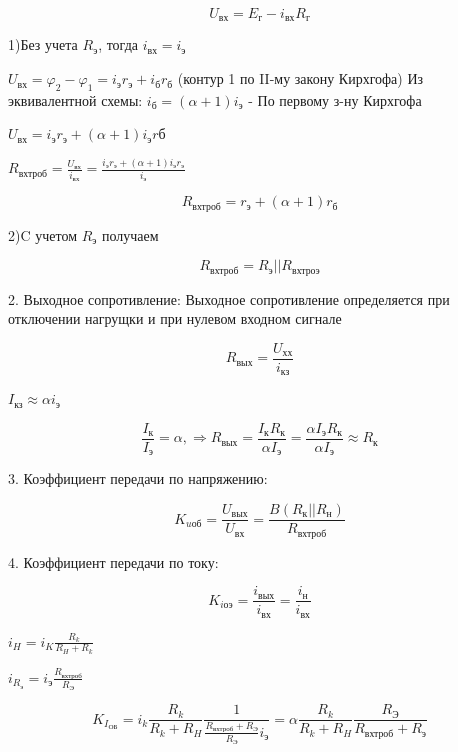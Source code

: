 \documentclass[12pt,a4paper]{article}
\begin{document}
$$U_\textit{вх}=E_\textit{г}-i_\textit{вх}R_\textit{г}$$

1)Без учета $R_\textit{э}$, тогда $i_\textit{вх}=i_\textit{э}$

$U_\textit{вх}=\varphi_2-\varphi_1=i_\textit{э}r_\textit{э}+i_\textit{б}r_\textit{б}$
(контур 1 по II-му закону Кирхгофа)
Из эквивалентной схемы:
$i_\textit{б}=(\alpha+1)i_\textit{э}$ - По первому з-ну Кирхгофа

$U_\textit{вх}=i_\textit{э}r_\textit{э}+(\alpha+1)i_\textit{э}r\textit{б}$

$R_\textit{вхтроб}=\frac{U_\textit{вх}}{i_\textit{вх}}=\frac{i_\textit{э}r_\textit{э}+(\alpha+1)i_\textit{э}r_\textit{э}}{i_\textit{э}}$

$$
R_\textit{вхтроб}=r_\textit{э} + (\alpha+1)r_\textit{б}
$$

2)C учетом $R_\textit{э}$ получаем

$$
R_\textit{вхтроб}=R_\textit{э}||R_\textit{вхтроэ}
$$

2. Выходное сопротивление:
 Выходное сопротивление определяется при отключении нагрущки и при нулевом входном сигнале
 
 $$R_\textit{вых}=\frac{U_\textit{хх}}{i_\textit{кз}}$$

$ I_\textit{кз}\approx \alpha i_\textit{э}$

$$
\frac{I_\textit{к}}{I_\textit{э}}=\alpha,\Rightarrow R_\textit{вых}=\frac{I_\textit{к}R_\textit{к}}{\alpha I_\textit{э}}=\frac{\alpha I_\textit{э}R_\textit{к}}{\alpha I_\textit{э}}\approx R_\textit{к}
$$

3. Коэффициент передачи по напряжению:

$$
K_\textit{uоб}=\frac{U_\textit{вых}}{U_\textit{вх}}=\frac{B(R_\textit{к}||R_\textit{н})}{R_\textit{вхтроб}}
$$

4. Коэффициент передачи по току:

$$K_\textit{iоэ}=\frac{i_\textit{вых}}{i_\textit{вх}}=\frac{i_\textit{н}}{i_\textit{вх}}$$

$i_H=i_K\frac{R_k}{R_H+R_k}$

$i_{R_\textit{э}}=i_\textit{э}\frac{R_\textit{вхтроб}}{R_\textit{Э}}$

$$
K_{I_\textit{ОБ}}=i_k\frac{R_k}{R_k+R_H}\frac{1}{\frac{R_\textit{вхтроб}+R_\textit{Э}}{R_\textit{Э}}i_\textit{э}}=\alpha \frac{R_k}{R_k+R_H} \frac{R_\textit{Э}}{R_\textit{вхтроб}+R_\textit{э}}
$$
\end{document}
